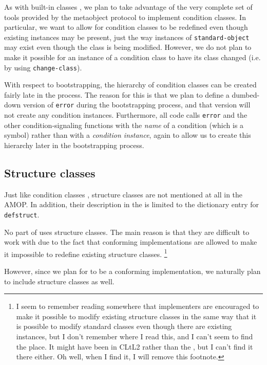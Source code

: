 As with built-in classes , we
plan to take advantage of the very complete set of tools provided by
the metaobject protocol to implement condition classes.  In
particular, we want to allow for condition classes to be redefined
even though existing instances may be present, just the way instances
of \texttt{standard-object} may exist even though the class is being
modified.  However, we do not plan to make it possible for an instance
of a condition class to have its class changed (i.e. by using
\texttt{change-class}).  

With respect to bootstrapping, the hierarchy of condition classes can
be created fairly late in the process.  The reason for this is that we
plan to define a dumbed-down version of \texttt{error} during the
bootstrapping process, and that version will not create any condition
instances.  Furthermore, all \sysname{} code calls \texttt{error} and
the other condition-signaling functions with the \emph{name} of a
condition (which is a symbol) rather than with a \emph{condition
  instance}, again to allow us to create this hierarchy later in the
bootstrapping process. 

\subsection{Structure classes}
\label{object-system-structure-classes}

Just like condition classes ,
structure classes are not mentioned at all in the AMOP.  In addition,
their description in the \hs{} is limited to the dictionary entry
for \texttt{defstruct}.  

No part of \sysname{} uses structure classes.  The main reason is that
they are difficult to work with due to the fact that conforming
implementations are allowed to make it impossible to redefine
existing structure classes.%
\footnote{I seem to remember reading somewhere that implementers are
  encouraged to make it possible to modify existing structure classes
  in the same way that it is possible to modify standard classes even
  though there are existing instances, but I don't remember where I
  read this, and I can't seem to find the place.  It might have been
  in CLtL2 rather than the \hs{}, but I can't find it there
  either.  Oh well, when I find it, I will remove this footnote.}

However, since we plan for \sysname{} to be a conforming
implementation, we naturally plan to include structure classes as
well. 

